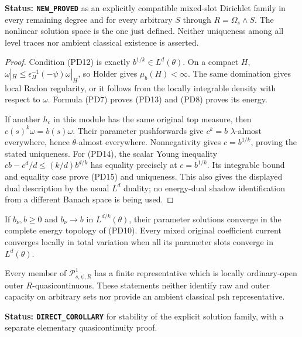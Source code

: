 \noindent\textbf{Status: \texttt{NEW\_PROVED}} as an
explicitly compatible mixed-slot Dirichlet family in
every remaining degree and for every arbitrary $S$
through $R=\Omega_s\wedge S$. The nonlinear solution
space is the one just defined. Neither uniqueness
among all level traces nor ambient classical existence
is asserted.

\begin{proof}
Condition (PD12) is exactly
$b^{1/k}\in L^d(\theta)$. On a compact $H$,
$\omega|_H\leq\epsilon_H^{-1}(-\psi)\omega|_H$,
so Holder gives $\mu_b(H)<\infty$. The same domination
gives local Radon regularity, or it follows from the
locally integrable density with respect to $\omega$.
Formula (PD7) proves (PD13) and (PD8) proves its energy.

If another $h_c$ in this module has the same original
top measure, then
$c(s)^k\omega=b(s)\omega$. Their parameter pushforwards
give $c^k=b$ $\lambda$-almost everywhere, hence
$\theta$-almost everywhere. Nonnegativity gives
$c=b^{1/k}$, proving the stated uniqueness.
For (PD14), the scalar Young inequality
$cb-c^d/d\leq(k/d)b^{d/k}$ has equality precisely
at $c=b^{1/k}$. Its integrable bound and equality
case prove (PD15) and uniqueness. This also gives
the displayed dual description by the usual
$L^d$ duality; no energy-dual shadow identification
from a different Banach space is being used.
\end{proof}

\begin{proposition}
\label{prop:r12-parameter-source-stability}
If $b_\nu,b\geq0$ and
$b_\nu\to b$ in $L^{d/k}(\theta)$, their parameter
solutions converge in the complete energy topology
of (PD10). Every mixed original coefficient current
converges locally in total variation when all its
parameter slots converge in $L^d(\theta)$.

Every member of $\mathscr P^1_{s,\psi,R}$ has a finite
representative which is locally ordinary-open outer
$R$-quasicontinuous. These statements neither identify
raw and outer capacity on arbitrary sets nor provide
an ambient classical psh representative.
\end{proposition}

\noindent\textbf{Status: \texttt{DIRECT\_COROLLARY}}
for stability of the explicit solution family, with
a separate elementary quasicontinuity proof.

